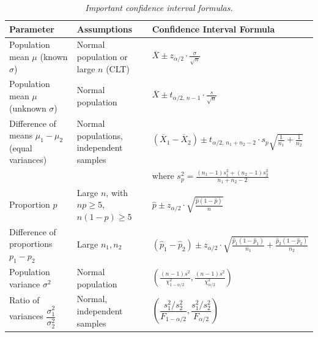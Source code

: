 \documentclass[twoside]{book}
\begin{document}

\begin{table}
	\centering
	\begin{tabular}{@{}lll@{}}
		\toprule
		\textbf{Parameter} & \textbf{Assumptions} & \textbf{Confidence Interval Formula} \\ \midrule

		Population mean $\mu$ (known $\sigma$) &
		Normal population or large $n$ (CLT) &
		$\displaystyle \overline{X} \pm z_{\alpha/2} \cdot \frac{\sigma}{\sqrt{n}}$ \\[10pt]

		Population mean $\mu$ (unknown $\sigma$) &
		Normal population &
		$\displaystyle \overline{X} \pm t_{\alpha/2,\,n-1} \cdot \frac{s}{\sqrt{n}}$ \\[10pt]

		Difference of means $\mu_1 - \mu_2$ (equal variances) &
		Normal populations, independent samples &
		$\displaystyle (\overline{X}_1 - \overline{X}_2) \pm t_{\alpha/2,\,n_1+n_2-2} \cdot s_p \sqrt{\frac{1}{n_1} + \frac{1}{n_2}}$ \\
		& & where $\displaystyle s_p^2 = \frac{(n_1-1)s_1^2 + (n_2-1)s_2^2}{n_1 + n_2 - 2}$ \\[10pt]

		Proportion $p$ &
		Large $n$, with $np \ge 5$, $n(1-p) \ge 5$ &
		$\displaystyle \hat{p} \pm z_{\alpha/2} \cdot \sqrt{\frac{\hat{p}(1 - \hat{p})}{n}}$ \\[10pt]

		Difference of proportions $p_1 - p_2$ &
		Large $n_1, n_2$ &
		$\displaystyle (\hat{p}_1 - \hat{p}_2) \pm z_{\alpha/2} \cdot \sqrt{ \frac{\hat{p}_1(1 - \hat{p}_1)}{n_1} + \frac{\hat{p}_2(1 - \hat{p}_2)}{n_2} }$ \\[10pt]

		Population variance $\sigma^2$ &
		Normal population &
		$\displaystyle \left( \frac{(n-1)s^2}{\chi^2_{1-\alpha/2}}, \frac{(n-1)s^2}{\chi^2_{\alpha/2}} \right)$ \\[10pt]

		Ratio of variances $\dfrac{\sigma_1^2}{\sigma_2^2}$ &
		Normal, independent samples &
		$\displaystyle \left( \dfrac{s_1^2 / s_2^2}{F_{1-\alpha/2}}, \dfrac{s_1^2 / s_2^2}{F_{\alpha/2}} \right)$ \\

		\bottomrule
	\end{tabular}
    \caption{\textit{Important confidence interval formulas.}}
	\label{tab:ci_sideways}
\end{table}
\end{document}
